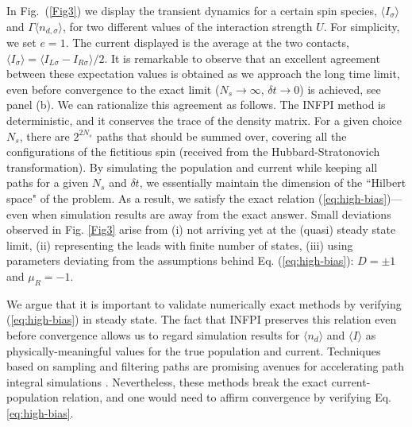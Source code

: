 \documentclass[aps,pra,twocolumn,groupedaddress,showpacs,superscriptaddress,amssymb,amsmath]{revtex4-1}
\begin{document}

In Fig.~(\ref{Fig3}) we display the transient dynamics for a certain spin species, $\langle I_{\sigma}\rangle$  and 
$\Gamma \langle n_{d,\sigma} \rangle$, for two different values of the interaction strength $U$. 
For simplicity, we set $e=1$.
The current displayed is the average at the two contacts, $\langle I_{\sigma}\rangle = \langle I_{L\sigma} - I_{R\sigma}\rangle/2 $.
It is remarkable to observe that an excellent agreement between these expectation values 
is obtained as we approach the long time limit, 
even before convergence to the exact limit ($N_s\rightarrow \infty$, $\delta t\rightarrow 0$) is achieved, see panel (b).
%
We can rationalize this agreement as follows. 
The INFPI method is deterministic, and it conserves the trace of the density matrix. 
For a given choice $N_s$, there are $2^{2N_s}$ paths that should be summed over, covering all the configurations
of the fictitious spin (received from the Hubbard-Stratonovich transformation). 
By simulating the population and current while
keeping all paths for a given $N_s$ and $\delta t$, we essentially maintain the dimension of 
the ``Hilbert space" of the problem. As a result, we
satisfy the exact relation (\ref{eq:high-bias})---even when simulation results are away from the exact answer.
Small deviations observed in Fig. \ref{Fig3} arise from (i) not arriving yet at the (quasi) steady state limit,  (ii)
representing the leads with finite number of states, (iii) using parameters deviating from the
assumptions behind Eq. (\ref{eq:high-bias}): $D=\pm1$ and $\mu_R=-1$. 


We argue that it is important to validate numerically exact methods
by verifying (\ref{eq:high-bias}) in steady state. The fact that INFPI preserves this relation even before convergence 
allows us to regard simulation results for $\langle n_d \rangle$ and $\langle I\rangle$ 
as physically-meaningful values for the true population and current.
Techniques based on sampling and filtering paths are promising avenues for accelerating path integral simulations 
\cite{Makri2,Makri3}.
Nevertheless, these methods break the exact current-population relation, and one would need
to affirm convergence by verifying Eq. \ref{eq:high-bias}.
\end{document}
